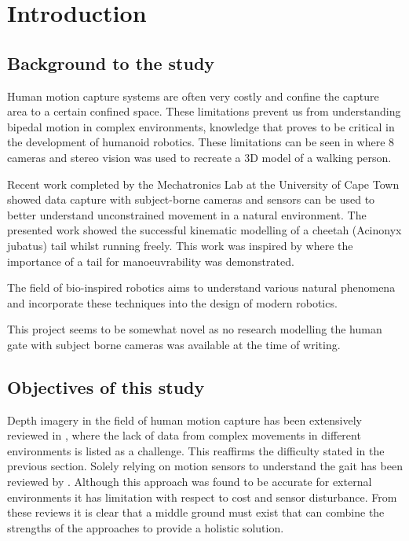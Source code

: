 \chapter{Introduction}

\section{Background to the study}
Human motion capture systems are often very costly and confine the capture area to a certain confined space. These limitations prevent us from understanding bipedal motion in complex environments, knowledge that proves to be critical in the development of humanoid robotics. These limitations can be seen in \cite{sandau2014markerless} where 8 cameras and stereo vision was used to recreate a 3D model of a walking person. 

Recent work \cite{patel2017trackingieee} completed by the Mechatronics Lab at the University of Cape Town showed data capture with subject-borne cameras and sensors can be used to better understand unconstrained movement in a natural environment. The presented work showed the successful kinematic modelling of a cheetah (Acinonyx jubatus) tail whilst running freely. This work was inspired by \cite{patel2014rapid} where the importance of a tail for manoeuvrability was demonstrated.
 
The field of bio-inspired robotics aims to understand various natural phenomena and incorporate these techniques into the design of modern robotics. 


This project seems to be somewhat novel as no research modelling the human gate with subject borne cameras was available at the time of writing. 


  
\section{Objectives of this study}
Depth imagery in the field of human motion capture has been extensively reviewed in \cite{chen2013survey}, where the lack of data from complex movements in different environments is listed as a challenge. This reaffirms the difficulty stated in the previous section.  Solely relying on motion sensors to understand the gait has been reviewed by \cite{picerno201725}. Although this approach was found to be accurate for external environments it has limitation with respect to cost and sensor disturbance. From these reviews it is clear that a middle ground must exist that can combine the strengths of the approaches to provide a holistic solution.

